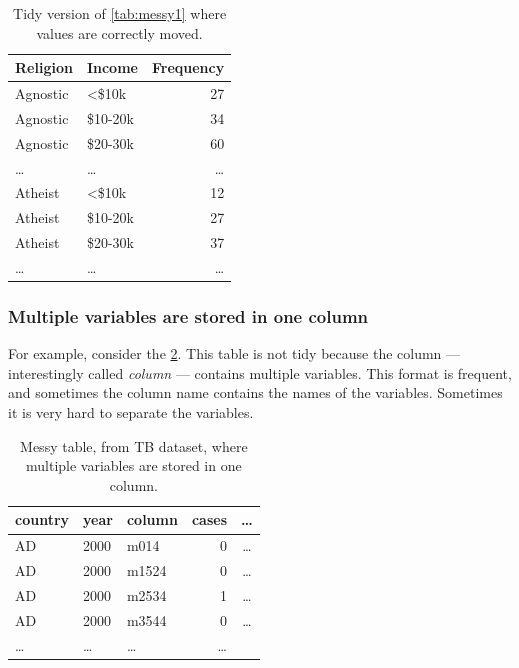 \begin{table}
  \centering
  \begin{tabular}{l l r}
    \toprule
    \textbf{Religion} & \textbf{Income} & \textbf{Frequency} \\
    \midrule
    Agnostic & <\$10k & 27 \\
    Agnostic & \$10-20k & 34 \\
    Agnostic & \$20-30k & 60 \\
    \dots & \dots & \dots \\
    Atheist & <\$10k & 12 \\
    Atheist & \$10-20k & 27 \\
    Atheist & \$20-30k & 37 \\
    \dots & \dots & \dots \\
    \bottomrule
  \end{tabular}
  \caption{Tidy version of \cref{tab:messy1} where values are correctly moved.}
  \label{tab:tidy1}
\end{table}

\subsubsection{Multiple variables are stored in one column}  For example, consider the
\cref{tab:messy2}.  This table is not tidy because the column --- interestingly called
\emph{column} --- contains multiple variables.  This format is frequent, and sometimes the
column name contains the names of the variables.  Sometimes it is very hard to separate
the variables.

\begin{table}
  \centering
  \begin{tabular}{l l l r c}
    \toprule
    \textbf{country} & \textbf{year} & \textbf{column} & \textbf{cases} & \textbf{\dots} \\
    \midrule
    AD & 2000 & m014 & 0 & \dots \\
    AD & 2000 & m1524 & 0 & \dots \\
    AD & 2000 & m2534 & 1 & \dots \\
    AD & 2000 & m3544 & 0 & \dots \\
    \dots & \dots & \dots & \dots \\
    \bottomrule
  \end{tabular}
  \caption{Messy table, from TB dataset, where multiple variables are stored in one column.}
  \label{tab:messy2}
\end{table}

